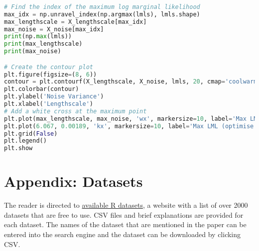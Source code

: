 \documentclass[12pt,a4paper]{article}
\begin{document}
\begin{lstlisting}[language=python, caption={Code of the Creation of Figure \ref{fig:LML contour Orange County plot}}]
        
# Find the index of the maximum log marginal likelihood
max_idx = np.unravel_index(np.argmax(lmls), lmls.shape)
max_lengthscale = X_lengthscale[max_idx]
max_noise = X_noise[max_idx]
print(np.max(lmls))
print(max_lengthscale)
print(max_noise)

# Create the contour plot
plt.figure(figsize=(8, 6))
contour = plt.contourf(X_lengthscale, X_noise, lmls, 20, cmap='coolwarm')
plt.colorbar(contour)
plt.ylabel('Noise Variance')
plt.xlabel('Lengthscale')
# Add a white cross at the maximum point
plt.plot(max_lengthscale, max_noise, 'wx', markersize=10, label='Max LML (graphical method)')
plt.plot(6.067, 0.00189, 'kx', markersize=10, label='Max LML (optimise method)')
plt.grid(False)
plt.legend()
plt.show
\end{lstlisting}


\section{Appendix: Datasets}
\label{Appendix: Datasets}
The reader is directed to \href{https://vincentarelbundock.github.io/Rdatasets/articles/data.html}{available R datasets}, a website with a list of over 2000 datasets that are free to use. CSV files and brief explanations are provided for each dataset. The names of the dataset that are mentioned in the paper can be entered into the search engine and the dataset can be downloaded by clicking CSV.

\newpage


\end{document}
